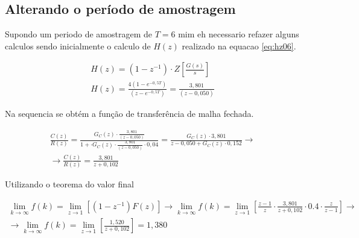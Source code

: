 \documentclass[a4paper,12pt]{article}
\begin{document}
		\subsection{Alterando o período de amostragem}
			Supondo um periodo de amostragem de $T = 6$ mim eh necessario refazer alguns calculos sendo inicialmente o calculo de $H(z)$ realizado na equacao \ref{eq:hz06}.
			
			\begin{equation}
			\left.
			\begin{array}{c}
				\displaystyle H(z) = (1 - z^{-1}) \cdot Z\left[\frac{G(s)}{s}\right] \\[20pt]
				
				\displaystyle H(z)  = \frac{4(1 - e^{-0,5T})}{(z-e^{-0,5T})} = \frac{3,801}{(z-0,050)}
			\end{array}
			\right.
			\quad 
		\end{equation}
		
		Na sequencia se obtém a função de transferência de malha fechada.
		
		\begin{equation}
			\left.
			\begin{array}{c}
				\displaystyle \frac{C(z)}{R(z)} = \frac{G_C(z) \cdot \displaystyle \frac{3,801}{(z-0,050)}}{1 + \cdot G_C(z) \cdot \displaystyle \frac{3,801}{(z-0,050)} \cdot 0,04} = \frac{G_C(z) \cdot 3,801}{z - 0,050 + G_C(z) \cdot 0,152} \rightarrow \\[30pt]
				
				\displaystyle \rightarrow \frac{C(z)}{R(z)} = \frac{3,801}{z + 0,102}
			\end{array}
			\right.
			\quad 
			\label{eq:ftma}
		\end{equation}
		
		Utilizando o teorema do valor final
		
		\begin{equation}
			\left.
			\begin{array}{c}
				\displaystyle \lim_{k \to \infty}f(k) = \lim_{z \to 1}\left[(1-z^{-1})F(z) \right] \rightarrow \lim_{k \to \infty}f(k) = \lim_{z \to 1}\left[ \frac{z-1}{z} \cdot \frac{3,801}{z + 0,102} \cdot 0.4 \cdot \frac{z}{z-1}  \right] \rightarrow \\[20pt]
				
				\displaystyle \rightarrow \lim_{k \to \infty}f(k) =  \lim_{z \to 1}\left[  \frac{1,520}{z + 0,102}  \right] = 1,380
			\end{array}
			\right.
			\quad 
		\end{equation}	
		
\end{document}
